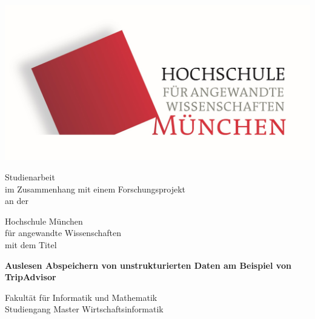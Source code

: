\thispagestyle{empty}
\begin{center}
	\includegraphics[scale=0.5]{Bilder/HM1_logo.png}


	
	\vspace{1.5cm}
	\huge{Studienarbeit}\\\vspace{1.5cm}
	\large{im Zusammenhang mit einem Forschungsprojekt}\\\vspace{0.5cm}
	\large{an der}\\\vspace{0.5cm}
	
	\huge{Hochschule München}\\
	\normalsize {für angewandte Wissenschaften}\\\vspace{0.5cm}
	\large{mit dem Titel}\\\vspace{1cm}
    \begin{center}
		\Huge{\textbf{Auslesen Abspeichern von unstrukturierten Daten am Beispiel von TripAdvisor}}\\[2.0cm]
    \end{center}
    
	
	
	\large{Fakultät für Informatik und Mathematik}\\
	\normalsize {Studiengang Master Wirtschaftsinformatik}\\\vspace{2.1cm}
	
\end{center}

